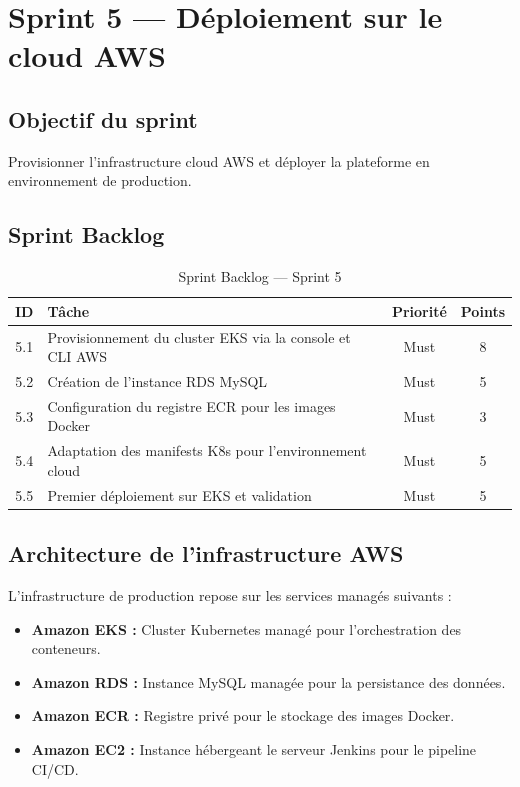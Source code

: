 \section{Sprint 5 --- Déploiement sur le cloud AWS}

\subsection{Objectif du sprint}
Provisionner l'infrastructure cloud AWS et déployer la plateforme en environnement de production.

\subsection{Sprint Backlog}

\begin{table}[H]
\centering
\renewcommand{\arraystretch}{1.2}
\begin{tabular}{|c|p{9cm}|c|c|}
\hline
\textbf{ID} & \textbf{Tâche} & \textbf{Priorité} & \textbf{Points} \\
\hline
5.1 & Provisionnement du cluster EKS via la console et CLI AWS & Must & 8 \\
\hline
5.2 & Création de l'instance RDS MySQL & Must & 5 \\
\hline
5.3 & Configuration du registre ECR pour les images Docker & Must & 3 \\
\hline
5.4 & Adaptation des manifests K8s pour l'environnement cloud & Must & 5 \\
\hline
5.5 & Premier déploiement sur EKS et validation & Must & 5 \\
\hline
\end{tabular}
\caption{Sprint Backlog --- Sprint 5}
\label{tab:sprint5_backlog}
\end{table}

\subsection{Architecture de l'infrastructure AWS}
L'infrastructure de production repose sur les services managés suivants :
\begin{itemize}
    \item \textbf{Amazon EKS :} Cluster Kubernetes managé pour l'orchestration des conteneurs.
    \item \textbf{Amazon RDS :} Instance MySQL managée pour la persistance des données.
    \item \textbf{Amazon ECR :} Registre privé pour le stockage des images Docker.
    \item \textbf{Amazon EC2 :} Instance hébergeant le serveur Jenkins pour le pipeline CI/CD.
\end{itemize}

